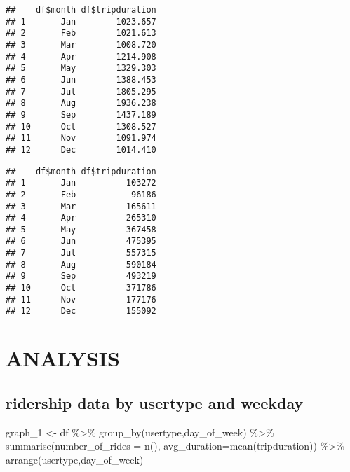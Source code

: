 \documentclass[
]{article}
\newenvironment{Shaded}{\begin{snugshade}}{\end{snugshade}}
\newcommand{\AttributeTok}[1]{\textcolor[rgb]{0.77,0.63,0.00}{#1}}
\newcommand{\FunctionTok}[1]{\textcolor[rgb]{0.00,0.00,0.00}{#1}}
\newcommand{\NormalTok}[1]{#1}
\newcommand{\OtherTok}[1]{\textcolor[rgb]{0.56,0.35,0.01}{#1}}
\newcommand{\SpecialCharTok}[1]{\textcolor[rgb]{0.00,0.00,0.00}{#1}}
\begin{document}
\begin{verbatim}
##    df$month df$tripduration
## 1       Jan        1023.657
## 2       Feb        1021.613
## 3       Mar        1008.720
## 4       Apr        1214.908
## 5       May        1329.303
## 6       Jun        1388.453
## 7       Jul        1805.295
## 8       Aug        1936.238
## 9       Sep        1437.189
## 10      Oct        1308.527
## 11      Nov        1091.974
## 12      Dec        1014.410
\end{verbatim}

\begin{Shaded}
\end{Shaded}

\begin{verbatim}
##    df$month df$tripduration
## 1       Jan          103272
## 2       Feb           96186
## 3       Mar          165611
## 4       Apr          265310
## 5       May          367458
## 6       Jun          475395
## 7       Jul          557315
## 8       Aug          590184
## 9       Sep          493219
## 10      Oct          371786
## 11      Nov          177176
## 12      Dec          155092
\end{verbatim}

\hypertarget{analysis}{%
\section{ANALYSIS}\label{analysis}}

\hypertarget{ridership-data-by-usertype-and-weekday}{%
\subsection{ridership data by usertype and
weekday}\label{ridership-data-by-usertype-and-weekday}}

\begin{Shaded}
\begin{Highlighting}[]
\NormalTok{graph\_1 }\OtherTok{\textless{}{-}}\NormalTok{ df }\SpecialCharTok{\%\textgreater{}\%}
  \FunctionTok{group\_by}\NormalTok{(usertype,day\_of\_week) }\SpecialCharTok{\%\textgreater{}\%} 
  \FunctionTok{summarise}\NormalTok{(}\AttributeTok{number\_of\_rides =} \FunctionTok{n}\NormalTok{(), }\AttributeTok{avg\_duration=}\FunctionTok{mean}\NormalTok{(tripduration)) }\SpecialCharTok{\%\textgreater{}\%} 
  \FunctionTok{arrange}\NormalTok{(usertype,day\_of\_week)}
\end{Highlighting}
\end{Shaded}
\end{document}
